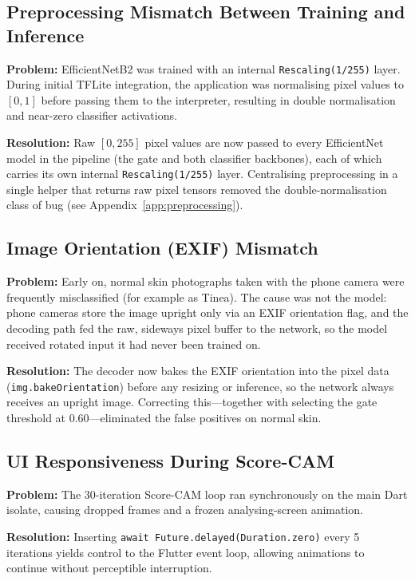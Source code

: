 \subsection{Preprocessing Mismatch Between Training and Inference}

\textbf{Problem:} EfficientNetB2 was trained with an internal \texttt{Rescaling(1/255)} layer. During initial TFLite integration, the application was normalising pixel values to $[0, 1]$ before passing them to the interpreter, resulting in double normalisation and near-zero classifier activations.

\textbf{Resolution:} Raw $[0, 255]$ pixel values are now passed to every EfficientNet model in the pipeline (the gate and both classifier backbones), each of which carries its own internal \texttt{Rescaling(1/255)} layer. Centralising preprocessing in a single helper that returns raw pixel tensors removed the double-normalisation class of bug (see Appendix~\ref{app:preprocessing}).

\subsection{Image Orientation (EXIF) Mismatch}

\textbf{Problem:} Early on, normal skin photographs taken with the phone camera were frequently misclassified (for example as Tinea). The cause was not the model: phone cameras store the image upright only via an EXIF orientation flag, and the decoding path fed the raw, sideways pixel buffer to the network, so the model received rotated input it had never been trained on.

\textbf{Resolution:} The decoder now bakes the EXIF orientation into the pixel data (\texttt{img.bakeOrientation}) before any resizing or inference, so the network always receives an upright image. Correcting this---together with selecting the gate threshold at 0.60---eliminated the false positives on normal skin.

\subsection{UI Responsiveness During Score-CAM}

\textbf{Problem:} The 30-iteration Score-CAM loop ran synchronously on the main Dart isolate, causing dropped frames and a frozen analysing-screen animation.

\textbf{Resolution:} Inserting \texttt{await Future.delayed(Duration.zero)} every 5 iterations yields control to the Flutter event loop, allowing animations to continue without perceptible interruption.

